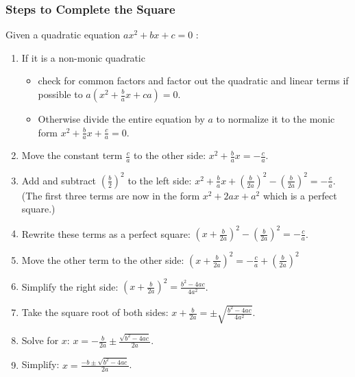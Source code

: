 \documentclass[12pt]{article}
\begin{document}
\begin{center}
\end{center}

\subsubsection*{Steps to Complete the Square}

Given a quadratic equation $ax^2 + bx + c = 0$ :

\begin{enumerate}
    \item If it is a non-monic quadratic
        \begin{itemize}
        \item check for common factors and factor out the quadratic and linear terms if possible to $a(x^2+\frac{b}{a}x+ca)=0$.
        \item Otherwise divide the entire equation by $a$ to normalize it to the monic form $x^2 + \frac{b}{a}x + \frac{c}{a}=0.$
        \end{itemize}
    \item Move the constant term $\frac{c}{a}$ to the other side: $x^2 + \frac{b}{a}x = -\frac{c}{a}$.
    \item Add and subtract $(\frac{b}{2})^2$ to the left side: $x^2 + \frac{b}{a}x + (\frac{b}{2a})^2 - (\frac{b}{2a})^2 = -\frac{c}{a}$.\\
    
    (The first three terms are now in the form $x^2+2ax+a^2$ which is a perfect square.)\\
    
\newpage

\item Rewrite these terms as a perfect square: $(x + \frac{b}{2a})^2 - (\frac{b}{2a})^2 = -\frac{c}{a}$.
    \item Move the other term to the other side:  $(x + \frac{b}{2a})^2 = -\frac{c}{a} + (\frac{b}{2a})^2$
    \item Simplify the right side: $(x + \frac{b}{2a})^2 = \frac{b^2 - 4ac}{4a^2}$.
    \item Take the square root of both sides: $x + \frac{b}{2a} = \pm \sqrt{\frac{b^2 - 4ac}{4a^2}}$.
    \item Solve for $x$: $x = -\frac{b}{2a} \pm \frac{\sqrt{b^2 - 4ac}}{2a}$.
    \item Simplify: $x = \frac{-b\pm\sqrt{b^2 - 4ac}}{2a}$.
\end{enumerate}
\end{document}
